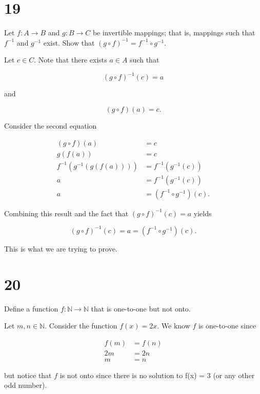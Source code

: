 \documentclass[a4paper]{article}
\begin{document}
\section*{19}

Let $f: A \rightarrow B$ and $g: B \rightarrow C$ be invertible mappings; that is, mappings such that $f^{-1}$ and $g^{-1}$ exist. Show that $(g \circ f)^{-1} = f^{-1} \circ g^{-1}$.

\vspace{\baselineskip}

Let $c \in C$. Note that there exists $a \in A$ such that 

$$(g \circ f)^{-1}(c) = a$$

and

$$(g \circ f)(a) = c.$$

Consider the second equation

\begin{align*}
(g \circ f)(a) &= c \\ 
g(f(a)) &= c \\
f^{-1}(g^{-1}(g(f(a)))) &= f^{-1}(g^{-1}(c)) \\
a &= f^{-1}(g^{-1}(c)) \\
a &= (f^{-1} \circ g^{-1}) (c).
\end{align*}

Combining this result and the fact that $(g \circ f)^{-1}(c) = a$ yields

$$(g \circ f)^{-1}(c) = a = (f^{-1} \circ g^{-1})(c).$$

This is what we are trying to prove.


\section*{20}

Define a function $f: \mathbb{N} \rightarrow \mathbb{N}$ that is one-to-one but not onto.

\vspace{\baselineskip}

Let $m,n \in \mathbb{N}$. Consider the function $f(x) = 2x$. We know $f$ is one-to-one since

\begin{align*}
f(m) &= f(n) \\
2m &= 2n \\
m &= n
\end{align*}

but notice that $f$ is not onto since there is no solution to f(x) = 3 (or any other odd number).
\end{document}
